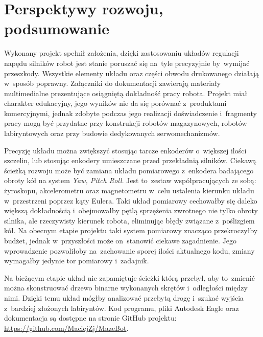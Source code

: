 \documentclass[11pt]{article}
\begin{document}
\section{Perspektywy rozwoju, podsumowanie}
Wykonany projekt spełnił założenia, dzięki zastosowaniu układów regulacji napędu silników robot jest stanie poruszać się na~tyle precyzyjnie by~wymijać przeszkody.
Wszystkie elementy układu oraz części obwodu drukowanego działają w~sposób poprawny.
Załączniki do dokumentacji zawierają materiały multimedialne prezentujące osiągniętą dokładność pracy robota.
Projekt miał charakter edukacyjny, jego wyników nie da się porównać z~produktami komercyjnymi, jednak zdobyte podczas jego realizacji doświadczenie i~fragmenty pracy mogą być przydatne przy konstrukcji robotów magazynowych, robotów labiryntowych oraz przy budowie dedykowanych serwomechanizmów.

Precyzję układu można zwiększyć stosując tarcze enkoderów o~większej ilości szczelin, lub stosując enkodery umieszczane przed przekładnią silników.
Ciekawą ścieżką rozwoju może być zamiana układu pomiarowego z~enkodera badającego obroty kół na system \textit{Yaw, Pitch Roll}.
Jest to~zestaw współpracujących ze sobą: żyroskopu, akcelerometru oraz magnetometru w~celu ustalenia kierunku układu w~przestrzeni poprzez kąty Eulera.
Taki układ pomiarowy cechowałby się daleko większą dokładnością i~obejmowałby pętlą sprzężenia zwrotnego nie tylko obroty silnika, ale rzeczywisty kierunek robota, eliminując błędy związane z~poślizgiem kół.
Na obecnym etapie projektu taki system pomiarowy znacząco przekroczyłby budżet, jednak w~przyszłości może on~stanowić ciekawe zagadnienie.
Jego wprowadzenie pozwoliłoby na~zachowanie sporej ilości aktualnego kodu, zmiany wymagałby jedynie tor pomiarowy i~zadajnik.

Na bieżącym etapie układ nie zapamiętuje ścieżki którą przebył, aby to~zmienić można skonstruować drzewo binarne wykonanych skrętów i~odległości między nimi.
Dzięki temu układ mógłby analizować przebytą drogę i~szukać wyjścia z~bardziej złożonych labiryntów.
Kod programu, pliki Autodesk Eagle oraz dokumentacja są dostępne na stronie GitHub projektu: \url{https://github.com/MaciejZj/MazeBot}.
\end{document}
